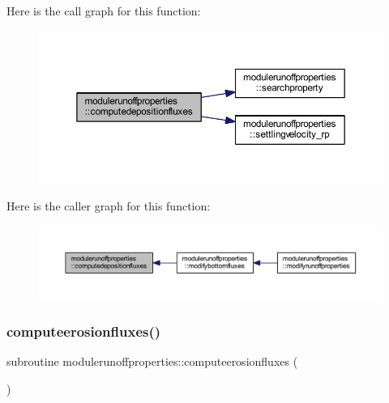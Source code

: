 Here is the call graph for this function\+:\nopagebreak
\begin{figure}[H]
\begin{center}
\leavevmode
\includegraphics[width=350pt]{namespacemodulerunoffproperties_a8bbf07614377370c486122ce0f904d0d_cgraph}
\end{center}
\end{figure}
Here is the caller graph for this function\+:\nopagebreak
\begin{figure}[H]
\begin{center}
\leavevmode
\includegraphics[width=350pt]{namespacemodulerunoffproperties_a8bbf07614377370c486122ce0f904d0d_icgraph}
\end{center}
\end{figure}
\mbox{\label{namespacemodulerunoffproperties_aa72049d47379b80cbd6f207ff9ac534b}} 
\subsubsection{\texorpdfstring{computeerosionfluxes()}{computeerosionfluxes()}}
{\footnotesize\ttfamily subroutine modulerunoffproperties\+::computeerosionfluxes (\begin{DoxyParamCaption}{ }\end{DoxyParamCaption})\hspace{0.3cm}{\ttfamily [private]}}

